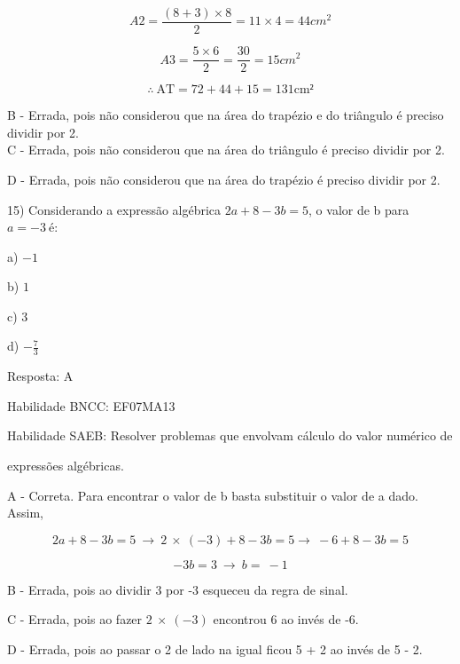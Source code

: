 \[A2 = \frac{\left( 8 + 3 \right) \times 8}{2} = 11 \times 4 = 44cm^{2}\]

\[A3 = \frac{5 \times 6}{2} = \frac{30}{2} = 15cm^{2}\]

\[\therefore\ \text{AT} = 72 + 44 + 15 = 131\text{cm}²\]

B - Errada, pois não considerou que na área do trapézio e do triângulo é
preciso dividir por 2.\\
C - Errada, pois não considerou que na área do triângulo é preciso
dividir por 2.

D - Errada, pois não considerou que na área do trapézio é preciso
dividir por 2.

15) Considerando a expressão algébrica \(2a + 8 - 3b = 5\), o valor de b
para \(a = - 3\ \)é:

a) \(- 1\)

b) \(1\)

c) \(3\)

d) \(- \frac{7}{3}\)

Resposta: A

Habilidade BNCC: EF07MA13

Habilidade SAEB: Resolver problemas que envolvam cálculo do valor
numérico de

expressões algébricas.

A - Correta. Para encontrar o valor de b basta substituir o valor de a
dado. Assim,

\[2a + 8 - 3b = 5\  \rightarrow \ 2\  \times \ \left( - 3 \right) + 8 - 3b = 5 \rightarrow \  - 6 + 8 - 3b = 5\]

\[- 3b = 3\  \rightarrow \ b = \  - 1\]

B - Errada, pois ao dividir 3 por -3 esqueceu da regra de sinal.

C - Errada, pois ao fazer \(2\  \times \ \left( - 3 \right)\) encontrou
6 ao invés de -6.

D - Errada, pois ao passar o 2 de lado na igual ficou 5 + 2 ao invés de
5 - 2.
